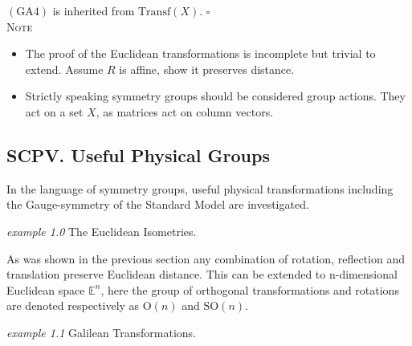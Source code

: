 \documentclass[floatfix,aps,prd,amsmath,amssymb]{revtex4}
\begin{document}
$(\mathrm{GA}4)$ is inherited from $\mathrm{Transf}(X)$. \hfill $\square$\\
\textsc{Note}
\begin{itemize}
\item The proof of the Euclidean transformations is incomplete but trivial to extend. Assume $R$ is affine, show it preserves distance.
\item Strictly speaking symmetry groups should be considered group actions. They act on a set $X$, as matrices act on column vectors.
\end{itemize}
\subsection{SCPV. Useful Physical Groups}

In the language of symmetry groups, useful physical transformations including the Gauge-symmetry of the Standard Model are investigated.

\begin{flushleft}\textit{example 1.0} The Euclidean Isometries. \end{flushleft}

As was shown in the previous section any combination of rotation, reflection and translation preserve Euclidean distance. This can be extended to n-dimensional Euclidean space $\mathbb{E}^n$, here the group of orthogonal transformations and rotations are denoted respectively as $\mathrm{O}(n)$ and $\mathrm{SO}(n)$.

\begin{flushleft}\textit{example 1.1} Galilean Transformations.\end{flushleft}
\end{document}
